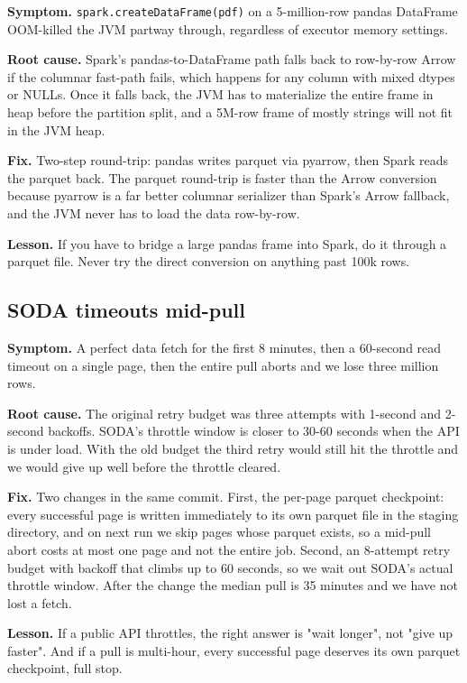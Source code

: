 \documentclass[11pt,letterpaper]{article}
\begin{document}
\textbf{Symptom.} \texttt{spark.createDataFrame(pdf)} on a 5-million-row pandas DataFrame OOM-killed the JVM partway through, regardless of executor memory settings.

\textbf{Root cause.} Spark's pandas-to-DataFrame path falls back to row-by-row Arrow if the columnar fast-path fails, which happens for any column with mixed dtypes or NULLs. Once it falls back, the JVM has to materialize the entire frame in heap before the partition split, and a 5M-row frame of mostly strings will not fit in the JVM heap.

\textbf{Fix.} Two-step round-trip: pandas writes parquet via pyarrow, then Spark reads the parquet back. The parquet round-trip is faster than the Arrow conversion because pyarrow is a far better columnar serializer than Spark's Arrow fallback, and the JVM never has to load the data row-by-row.

\textbf{Lesson.} If you have to bridge a large pandas frame into Spark, do it through a parquet file. Never try the direct conversion on anything past 100k rows.

\subsection{SODA timeouts mid-pull}

\textbf{Symptom.} A perfect data fetch for the first 8 minutes, then a 60-second read timeout on a single page, then the entire pull aborts and we lose three million rows.

\textbf{Root cause.} The original retry budget was three attempts with 1-second and 2-second backoffs. SODA's throttle window is closer to 30-60 seconds when the API is under load. With the old budget the third retry would still hit the throttle and we would give up well before the throttle cleared.

\textbf{Fix.} Two changes in the same commit. First, the per-page parquet checkpoint: every successful page is written immediately to its own parquet file in the staging directory, and on next run we skip pages whose parquet exists, so a mid-pull abort costs at most one page and not the entire job. Second, an 8-attempt retry budget with backoff that climbs up to 60 seconds, so we wait out SODA's actual throttle window. After the change the median pull is 35 minutes and we have not lost a fetch.

\textbf{Lesson.} If a public API throttles, the right answer is "wait longer", not "give up faster". And if a pull is multi-hour, every successful page deserves its own parquet checkpoint, full stop.
\end{document}
